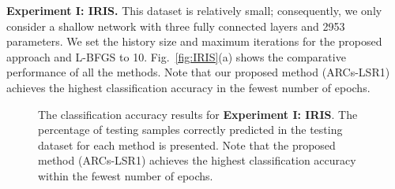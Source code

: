 \textbf{Experiment I: IRIS.}  %
This dataset is relatively small; consequently, we only consider a shallow network with three fully connected layers and 2953 parameters. We set the history size and maximum iterations for the proposed approach and L-BFGS to 10. Fig.\ \ref{fig:IRIS}(a) shows the comparative performance of all the methods. Note that our proposed method (ARCs-LSR1) achieves the highest classification accuracy in the fewest number of epochs.

\begin{figure}[!ht]
    \centering
{}
    \caption{The classification accuracy results for \textbf{Experiment I: IRIS}. 
	The percentage of testing samples correctly predicted in the testing dataset for each method is presented. Note that the proposed method (ARCs-LSR1) achieves the highest classification accuracy within the fewest number of epochs.}
    \label{fig:enter-label}
\end{figure}